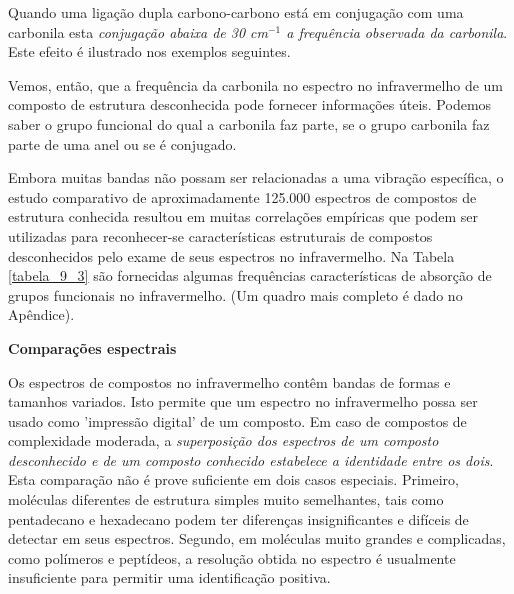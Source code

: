 Quando uma ligação dupla carbono-carbono está em conjugação com uma carbonila esta \textit{conjugação abaixa de 30 cm$^{-1}$ a frequência observada da carbonila}. Este efeito é ilustrado nos exemplos seguintes.

\begin{figure}[H]
    \centering
    \chemnameinit{}
    \qquad
    \chemnameinit{}
    \qquad
    \chemnameinit{}
    \qquad
    \chemnameinit{}
\end{figure}

Vemos, então, que a frequência da carbonila no espectro no infravermelho de um composto de estrutura desconhecida pode fornecer informações úteis. Podemos saber o grupo funcional do qual a carbonila faz parte, se o grupo carbonila faz parte de uma anel ou se é conjugado. 

Embora muitas bandas não possam ser relacionadas a uma vibração específica, o estudo comparativo de aproximadamente 125.000 espectros de compostos de estrutura conhecida resultou em muitas correlações empíricas que podem ser utilizadas para reconhecer-se características estruturais de compostos desconhecidos pelo exame de seus espectros no infravermelho. Na Tabela \ref{tabela_9_3} são fornecidas algumas frequências características de absorção de grupos funcionais no infravermelho. (Um quadro mais completo é dado no Apêndice).

\noindent \textbf{Comparações espectrais}

\noindent Os espectros de compostos no infravermelho contêm bandas de formas e tamanhos variados. Isto permite que um espectro no infravermelho possa ser usado como 'impressão digital' de um composto. Em caso de compostos de complexidade moderada, a \textit{superposição dos espectros de um composto desconhecido e de um composto conhecido estabelece a identidade entre os dois}. Esta comparação não é prove suficiente em dois casos especiais. Primeiro, moléculas diferentes de estrutura simples muito semelhantes, tais como pentadecano e hexadecano podem ter diferenças insignificantes e difíceis de detectar em seus espectros. Segundo, em moléculas muito grandes e complicadas, como polímeros e peptídeos, a resolução obtida no espectro é usualmente insuficiente para permitir uma identificação positiva.

